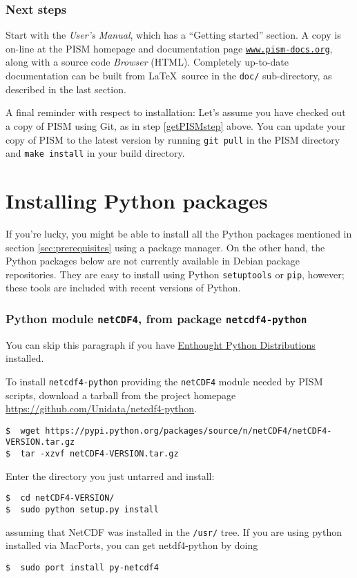\documentclass[titlepage,letterpaper,final]{scrartcl}
\begin{document}
\subsubsection*{Next steps}

Start with the \emph{User's Manual}, which has a ``Getting started'' section. A
copy is on-line at the PISM homepage and documentation page
\href{http://www.pism-docs.org/}{\texttt{www.pism-docs.org}}, along with a
source code \emph{Browser} (HTML). Completely up-to-date documentation can be
built from \LaTeX~source in the \texttt{doc/} sub-directory, as described in
the last section.

A final reminder with respect to installation: Let's assume you have checked
out a copy of PISM using Git, as in step \ref{getPISMstep} above. You can
update your copy of PISM to the latest version by running \texttt{git pull} in
the PISM directory and \texttt{make install} in your build directory.


\section{Installing Python packages}
\label{sec:python}

If you're lucky, you might be able to install all the Python packages mentioned
in section \ref{sec:prerequisites} using a package manager. On the other hand,
the Python packages below are not currently available in Debian package
repositories. They are easy to install using Python \texttt{setuptools} or \texttt{pip},
however; these tools are included with recent versions of Python.

\subsubsection*{Python module \texttt{netCDF4}, from package
  \texttt{netcdf4-python}}

You can skip this paragraph if you have
\href{http://www.enthought.com/}{Enthought Python Distributions} installed.

To install \texttt{netcdf4-python} providing the \texttt{netCDF4} module needed
by PISM scripts, download a tarball from the project homepage
\url{https://github.com/Unidata/netcdf4-python}.

\begin{verbatim}
$  wget https://pypi.python.org/packages/source/n/netCDF4/netCDF4-VERSION.tar.gz
$  tar -xzvf netCDF4-VERSION.tar.gz
\end{verbatim}
Enter the directory you just untarred and install:
\begin{verbatim}
$  cd netCDF4-VERSION/
$  sudo python setup.py install
\end{verbatim}
assuming that NetCDF was installed in the \texttt{/usr/} tree. If you
are using python installed via MacPorts, you can get netdf4-python by doing
\begin{verbatim}
$  sudo port install py-netcdf4
\end{verbatim}
\end{document}
